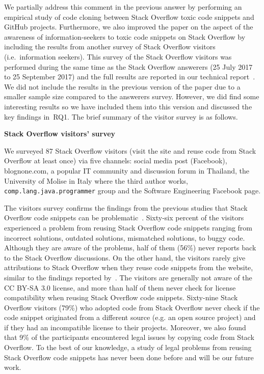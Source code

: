 \documentclass[a4paper,twoside,10pt]{reviewresponse}
\begin{document}
We partially address this comment in the previous answer by performing an empirical study of code cloning between Stack Overflow toxic code snippets and GitHub projects. Furthermore, we also improved the paper on the aspect of the awareness of information-seekers to toxic code snippets on Stack Overflow by including the results from another survey of Stack Overflow visitors (i.e.~information seekers). This survey of the Stack Overflow visitors was performed during the same time as the Stack Overflow answerers (25 July 2017 to 25 September 2017) and the full results are reported in our technical report~\citep{Ragkhitwetsagul_RN2017}. We did not include the results in the previous version of the paper due to a smaller sample size compared to the answerers survey. However, we did find some interesting results so we have included them into this version and discussed the key findings in~RQ1. The brief summary of the visitor survey is as follows.

\textbf{Stack Overflow visitors' survey}

We surveyed 87 Stack Overflow visitors (visit the site and reuse code from Stack Overflow at least once) via five channels: social media post (Facebook),
\textsf{blognone.com}, a popular IT community and discussion forum in Thailand, the University of Molise in Italy where the third author works, \texttt{comp.lang.java.programmer} group and the Software Engineering
Facebook page.

The visitors survey confirms the findings from the previous studies that Stack
Overflow code snippets can be problematic~\citep{Zhang2018,Acar2016,An2017}. Sixty-six
percent of the visitors experienced a problem from reusing Stack Overflow code
snippets ranging from incorrect solutions, outdated solutions, mismatched
solutions, to buggy code. Although they are aware of the problems, half of them
(56\%) never reports back to the Stack Overflow discussions. On the other hand,
the visitors rarely give attributions to Stack Overflow when they reuse code
snippets from the website, similar to the findings reported
by~\cite{Baltes2017}. The visitors are generally not aware of the CC BY-SA 3.0
license, and more than half of them never check for license compatibility when
reusing Stack Overflow code snippets. 
Sixty-nine Stack Overflow visitors (79\%) who adopted code from Stack Overflow never 
check if the code snippet originated from a different source (e.g. an open source project) 
and if they had an incompatible license to their projects.
Moreover, we also found that 9\% of the participants
encountered legal issues by copying code from Stack Overflow. To the best of our
knowledge, a study of legal problems from reusing Stack Overflow code snippets
has never been done before and will be our future work.
\end{document}
